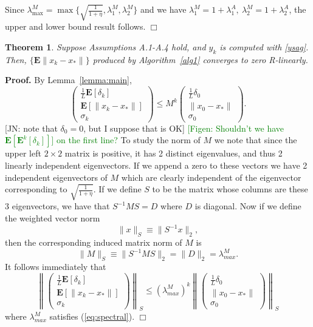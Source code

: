 \documentclass[11pt]{article}
\newtheorem{thm}{Theorem}
\newcommand{\E}{\mathbf{E}}
\begin{document}
Since $\lambda^M_{\max} = \max\{\sqrt{\frac{1}{1+\eta}},\lambda^M_1,\lambda^M_2\}$ and we have $\lambda^M_1=1+\lambda^A_1,\ \lambda^M_2=1+\lambda^A_2$, the upper and lower bound result follows.
\hspace*{\fill}$\Box$\medskip


\begin{thm}\label{thm:linear}
 Suppose Assumptions A.1-A.4 hold, and $y_k$ is computed with \eqref{ysag}.  Then, $\{\E\|x_k-x_\ast\|\}$ produced by Algorithm~\ref{alg1} converges to zero R-linearly.
\end{thm}

\noindent 
\textbf{Proof.}  By Lemma~\ref{lemma:main},
\begin{equation}
 \begin{pmatrix} \frac{1}{L}\E[\delta_k]\\ \E[\|x_k-x_\ast \|] \\ \sigma_k \end{pmatrix} 
\leq M^k
 \begin{pmatrix} \frac{1}{L}\delta_0 \\ \| x_0-x_\ast \| \\ \sigma_0 \end{pmatrix} .
\end{equation}
{\color{blue} [JN: note that $\delta_0=0$, but I suppose that is OK]} \textcolor{green}{[Figen: Shouldn't we have $\E[\E^k[\delta_k]]$] on the first line?}
To study the norm of $M$ we note that since the upper left $2 \times 2$ matrix is positive, it has 2 distinct eigenvalues, and thus 2 linearly independent eigenvectors. If we append a zero to these vectors we have 2 independent eigenvectors of $M$ which are clearly independent of the eigenvector corresponding to $\sqrt{\frac{1}{1+\eta}}$.  If we define $S$ to be the matrix whose columns are these 3 eigenvectors, we have that $S^{-1}MS =D$ where $D$ is diagonal. Now if we define the weighted vector norm 
\[ \|x\|_S \equiv \|S^{-1}x\|_2 ,  \]
then the corresponding induced matrix norm of $M$ is
\[
\|M\|_S \equiv  \| S^{-1}MS\|_2 = \|D\|_2= \lambda_{max}^M.
\]
It follows immediately that
\begin{equation}\label{rconv}
\left\| \begin{pmatrix} \frac{1}{L}\E[\delta_k]\\ \E[\|x_k-x_\ast \|] \\ \sigma_k \end{pmatrix} \right\|_S
\leq  (\lambda_{max}^M)^k
 \left\| \begin{pmatrix} \frac{1}{L}\delta_0 \\ \| x_0-x_\ast \| \\ \sigma_0 \end{pmatrix} \right\|_S
\end{equation}
where $ \lambda_{max}^M$ satisfies (\ref{eq:spectral}).
\hspace*{\fill}$\Box$\medskip
\end{document}
